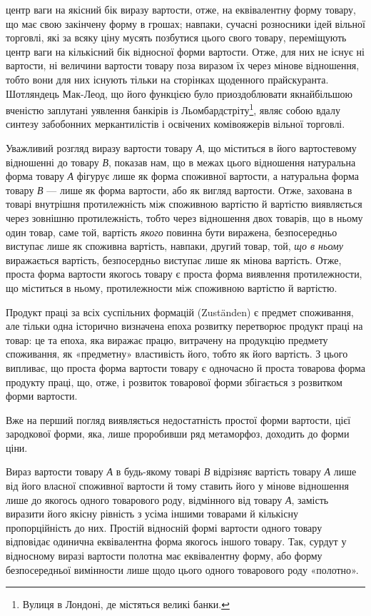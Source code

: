 \parcont{}  %
центр ваги на якісний бік виразу вартости, отже, на еквівалентну
форму товару, що має свою закінчену форму в грошах; навпаки,
сучасні розносники ідей вільної торговлі, які за всяку ціну мусять
позбутися цього свого товару, переміщують центр ваги на
кількісний бік відносної форми вартости. Отже, для них не існує
ні вартости, ні величини вартости товару поза виразом їх через
мінове відношення, тобто вони для них існують тільки на сторінках
щоденного прайскуранта. Шотляндець Мак-Леод, що його
функцією було приоздоблювати якнайбільшою вченістю заплутані
уявлення банкірів із Льомбардстріту\footnote*{
Вулиця в Лондоні, де містяться великі банки. 
}, являє собою вдалу синтезу
забобонних меркантилістів і освічених комівояжерів вільної
торговлі.

Уважливий розгляд виразу вартости товару \emph{А}, що міститься
в його вартостевому відношенні до товару \emph{В}, показав нам, що
в межах цього відношення натуральна форма товару \emph{А} фігурує
лише як форма споживної вартости, а натуральна форма товару
\emph{В} — лише як форма вартости, або як вигляд вартости. Отже,
захована в товарі внутрішня протилежність між споживною вартістю
й вартістю виявляється через зовнішню протилежність, тобто
через відношення двох товарів, що в ньому один товар, саме той,
вартість \emph{якого} повинна бути виражена, безпосередньо виступає
лише як споживна вартість, навпаки, другий товар, той, \emph{що в
ньому} виражається вартість, безпосердньо виступає лише як
мінова вартість. Отже, проста форма вартости якогось товару
є проста форма виявлення протилежности, що міститься в ньому,
протилежности між споживною вартістю й вартістю.

Продукт праці за всіх суспільних формацій (Zuständen) є
предмет споживання, але тільки одна історично визначена епоха
розвитку перетворює продукт праці на товар: це та епоха, яка
виражає працю, витрачену на продукцію предмету споживання,
як «предметну» властивість його, тобто як його вартість. З цього
випливає, що проста форма вартости товару є одночасно й проста
товарова форма продукту праці, що, отже, і розвиток товарової
форми збігається з розвитком форми вартости.

Вже на перший погляд виявляється недостатність простої
форми вартости, цієї зародкової форми, яка, лише проробивши
ряд метаморфоз, доходить до форми ціни.

Вираз вартости товару \emph{А} в будь-якому товарі \emph{В} відрізняє
вартість товару \emph{А} лише від його власної споживної вартости й
тому ставить його у мінове відношення лише до якогось одного
товарового роду, відмінного від товару \emph{А}, замість виразити його
якісну рівність з усіма іншими товарами й кількісну пропорційність
до них. Простій відносній формі вартости одного товару відповідає
одинична еквівалентна форма якогось іншого товару.
Так, сурдут у відносному виразі вартости полотна має еквівалентну
форму, або форму безпосередньої вимінности лише щодо
цього одного товарового роду «полотно».
